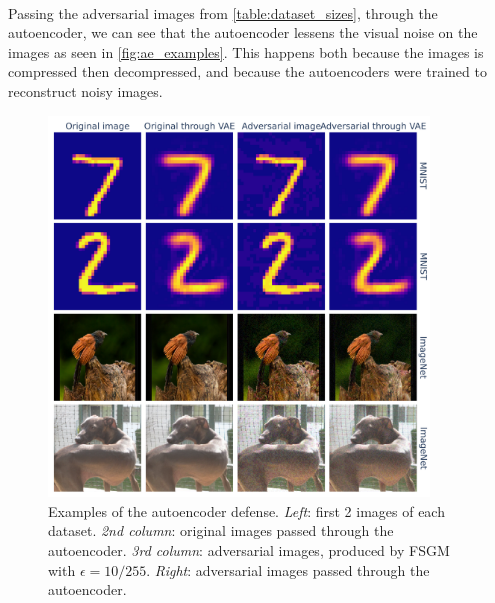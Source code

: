 \documentclass[]{scrarticle}
\renewcommand{\todo}[1]{}
\begin{document}
\todo{Maybe add a plot for distance between latent representations of clean vs adversarial}



\paragraph{}
Passing the adversarial images from \autoref{table:dataset_sizes},
through the autoencoder, we can see that the autoencoder
lessens the visual noise on the images as seen in \autoref{fig:ae_examples}.
This happens both because the images is compressed then decompressed,
and because the autoencoders were trained to reconstruct noisy images.

\begin{figure}[h]
  \centering
  \includegraphics[width=0.9\textwidth]{../images/ae_examples.png}
  \caption{
    Examples of the autoencoder defense.
    \emph{Left}: first 2 images of each dataset.
    \emph{2nd column}: original images passed through the autoencoder.
    \emph{3rd column}: adversarial images, produced by FSGM with $\epsilon = 10/ 255$.
    \emph{Right}: adversarial images passed through the autoencoder.
  }
  \label{fig:ae_examples}
\end{figure}
\end{document}
